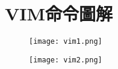 \chapter{VIM命令圖解}

\vspace{-50pt}

\begin{figure}[!ht]
\centering
\texttt{[image: vim1.png]}
\end{figure}


\begin{figure}[!ht]
\centering
\texttt{[image: vim2.png]}
\end{figure}